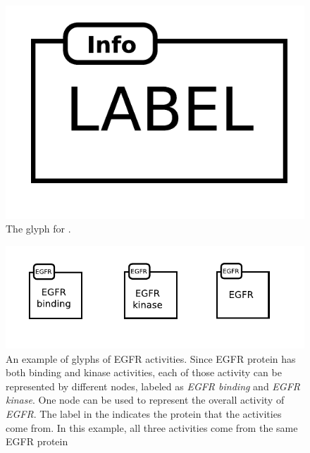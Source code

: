 \begin{figure}[H]
  \centering
  \includegraphics[scale = 0.5]{images/biologicalActivity}
  \caption{The \AF glyph for .}
  \label{fig:af:biologicalActivity}
\end{figure}

\begin{figure}[H]
  \centering
  \includegraphics[scale = 1]{examples/EGFR}
  \caption{An example of \AF glyphs of EGFR activities.  Since EGFR protein has both binding and kinase activities, each of those activity can be represented by different nodes, labeled as \emph{EGFR binding} and \emph{EGFR kinase}.  One node can be used to represent the overall activity of \emph{EGFR}.  The label in the  indicates the protein that the activities come from.  In this example, all three activities come from the same EGFR protein}
  \label{fig:af:EGFR}
\end{figure}